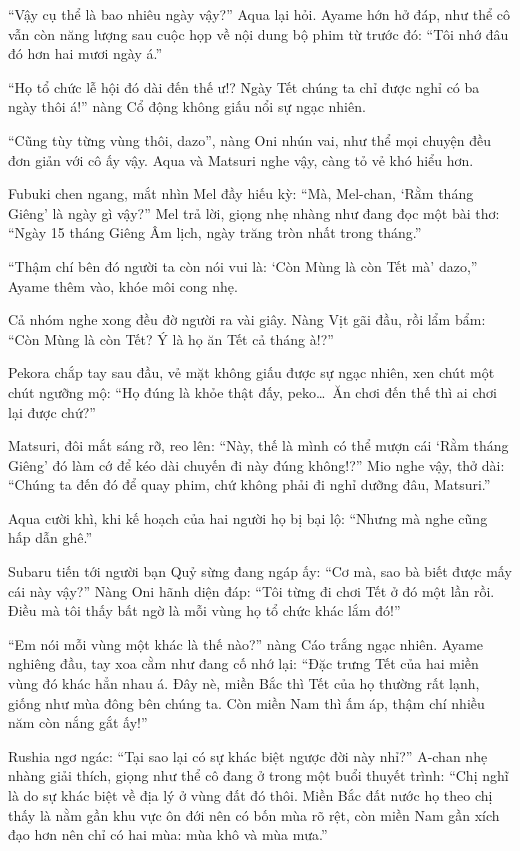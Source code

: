 \documentclass[../main.tex]{subfiles}
\begin{document}
``Vậy cụ thể là bao nhiêu ngày vậy?'' Aqua lại hỏi. Ayame hớn hở đáp, như thể cô vẫn còn năng lượng sau cuộc họp về nội dung bộ phim từ trước đó: ``Tôi nhớ đâu đó hơn hai mươi ngày á.''

``Họ tổ chức lễ hội đó dài đến thế ư!? Ngày Tết chúng ta chỉ được nghỉ có ba ngày thôi á!'' nàng Cổ động không giấu nổi sự ngạc nhiên.

``Cũng tùy từng vùng thôi, dazo'', nàng Oni nhún vai, như thể mọi chuyện đều đơn giản với cô ấy vậy. Aqua và Matsuri nghe vậy, càng tỏ vẻ khó hiểu hơn.

Fubuki chen ngang, mắt nhìn Mel đầy hiếu kỳ: ``Mà, Mel-chan, `Rằm tháng Giêng' là ngày gì vậy?'' Mel trả lời, giọng nhẹ nhàng như đang đọc một bài thơ: ``Ngày 15 tháng Giêng Âm lịch, ngày trăng tròn nhất trong tháng.''

``Thậm chí bên đó người ta còn nói vui là: `Còn Mùng là còn Tết mà' dazo,'' Ayame thêm vào, khóe môi cong nhẹ.

Cả nhóm nghe xong đều đờ người ra vài giây. Nàng Vịt gãi đầu, rồi lẩm bẩm: ``Còn Mùng là còn Tết? Ý là họ ăn Tết cả tháng à!?''

Pekora chắp tay sau đầu, vẻ mặt không giấu được sự ngạc nhiên, xen chút một chút ngưỡng mộ: ``Họ đúng là khỏe thật đấy, peko\dots\ Ăn chơi đến thế thì ai chơi lại được chứ?''

Matsuri, đôi mắt sáng rỡ, reo lên: ``Này, thế là mình có thể mượn cái `Rằm tháng Giêng' đó làm cớ để kéo dài chuyến đi này đúng không!?'' Mio nghe vậy, thở dài: ``Chúng ta đến đó để quay phim, chứ không phải đi nghỉ dưỡng đâu, Matsuri.''

Aqua cười khì, khi kế hoạch của hai người họ bị bại lộ: ``Nhưng mà nghe cũng hấp dẫn ghê.''

Subaru tiến tới người bạn Quỷ sừng đang ngáp ấy: ``Cơ mà, sao bà biết được mấy cái này vậy?'' Nàng Oni hãnh diện đáp: ``Tôi từng đi chơi Tết ở đó một lần rồi. Điều mà tôi thấy bất ngờ là mỗi vùng họ tổ chức khác lắm đó!''

``Em nói mỗi vùng một khác là thế nào?'' nàng Cáo trắng ngạc nhiên. Ayame nghiêng đầu, tay xoa cằm như đang cố nhớ lại: ``Đặc trưng Tết của hai miền vùng đó khác hẳn nhau á. Đây nè, miền Bắc thì Tết của họ thường rất lạnh, giống như mùa đông bên chúng ta. Còn miền Nam thì ấm áp, thậm chí nhiều năm còn nắng gắt ấy!''

Rushia ngơ ngác: ``Tại sao lại có sự khác biệt ngược đời này nhỉ?'' A-chan nhẹ nhàng giải thích, giọng như thể cô đang ở trong một buổi thuyết trình: ``Chị nghĩ là do sự khác biệt về địa lý ở vùng đất đó thôi. Miền Bắc đất nước họ theo chị thấy là nằm gần khu vực ôn đới nên có bốn mùa rõ rệt, còn miền Nam gần xích đạo hơn nên chỉ có hai mùa: mùa khô và mùa mưa.''
\end{document}
